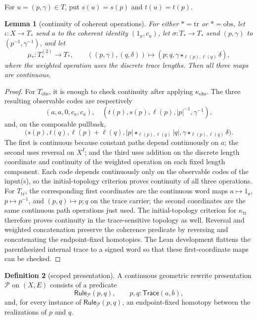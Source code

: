 \documentclass[10pt,reqno]{amsart}
\theoremstyle{definition}
\newtheorem{definition}{Definition}[section]
\theoremstyle{plain}
\newtheorem{lemma}[definition]{Lemma}
\theoremstyle{remark}
\newcommand{\Trace}{\mathsf{Trace}}
\begin{document}
For $u=(p,\gamma)\in T$, put $s(u)=s(p)$ and $t(u)=t(p)$.

\begin{lemma}[continuity of coherent operations]\label{lem:coherent-operations-continuous}
For either $*=\mathrm{tr}$ or $*=\mathrm{obs}$, let $\iota:X\to T_*$ send
$a$ to the coherent identity $(1_a,c_a)$, let $\sigma:T_*\to T_*$ send
$(p,\gamma)$ to
$(p^{-1},\gamma^{-1})$, and let
\[
  \mu_*:T_*^{(2)}\longrightarrow T_*,
  \qquad ((p,\gamma),(q,\delta))\longmapsto
    (p;q,\gamma\star_{\ell(p),\ell(q)}\delta),
\]
where the weighted operation uses the discrete trace lengths.  Then all three
maps are continuous.
\end{lemma}

\begin{proof}
For $T_{\mathrm{obs}}$, it is enough to check continuity after applying
$\kappa_{\mathrm{obs}}$.  The three resulting observable codes are respectively
\[
  (a,a,0,c_a,c_a),
\quad
  (t(p),s(p),\ell(p),|p|^{-1},\gamma^{-1}),
\]
and, on the composable pullback,
\[
  \bigl(s(p),t(q),\ell(p)+\ell(q),
    |p|\star_{\ell(p),\ell(q)}|q|,
    \gamma\star_{\ell(p),\ell(q)}\delta\bigr).
\]
The first is continuous because constant paths depend continuously on $a$;
the second uses reversal on $X^I$; and the third uses addition on the discrete
length coordinate and continuity of the weighted operation on each fixed
length component.  Each code depends continuously only on the observable
codes of the input(s), so the initial-topology criterion proves continuity of
all three operations.  For $T_{\mathrm{tr}}$, the corresponding first
coordinates are the continuous word maps
$a\mapsto 1_a$, $p\mapsto p^{-1}$, and $(p,q)\mapsto p;q$ on the trace
carrier; the second coordinates are the same continuous path operations just
used.  The initial-topology criterion for $\kappa_{\mathrm{tr}}$ therefore
proves continuity in the trace-sensitive topology as well.  Reversal and
weighted concatenation preserve the coherence predicate by reversing and
concatenating the endpoint-fixed homotopies.  The Lean development flattens
the parenthesized internal trace to a signed word so that these
first-coordinate maps can be checked.
\end{proof}

\begin{definition}[scoped presentation]
A continuous geometric rewrite presentation $\mathcal P$ on $(X,E)$ consists
of a predicate
\[
  \mathsf{Rule}_{\mathcal P}(p,q),\qquad p,q:\Trace(a,b),
\]
and, for every instance of $\mathsf{Rule}_{\mathcal P}(p,q)$, an endpoint-fixed homotopy
between the realizations of $p$ and $q$.
\end{definition}
\end{document}
